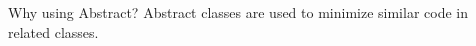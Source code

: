\begin{frame}{Why using Abstract?}
	Abstract classes are used to minimize similar code in related classes.
\end{frame}

%

